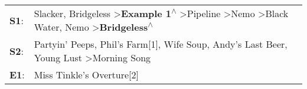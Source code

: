 \begin{supertabular}{p{0.03\textwidth}p{0.92\textwidth}}
 \textbf{S1}:  &  Slacker\textsuperscript{}, \enspace Bridgeless\textsuperscript{} \textgreater \enspace \textbf{Example 1\textsuperscript{$\wedge$}} \textgreater \enspace Pipeline\textsuperscript{} \textgreater \enspace Nemo\textsuperscript{} \textgreater \enspace Black Water\textsuperscript{}, \enspace Nemo\textsuperscript{} \textgreater \enspace \textbf{Bridgeless\textsuperscript{$\wedge$}}  \enspace  \\
 \textbf{S2}:  &                                                                                                                                  Partyin' Peeps\textsuperscript{}, \enspace Phil's Farm[1]\textsuperscript{}, \enspace Wife Soup\textsuperscript{}, \enspace Andy's Last Beer\textsuperscript{}, \enspace Young Lust\textsuperscript{} \textgreater \enspace Morning Song\textsuperscript{}  \enspace  \\
 \textbf{E1}:  &                                                                                                                                                                                                                                                                                                                                                 Miss Tinkle's Overture[2]\textsuperscript{}  \enspace  \\
\end{supertabular}
